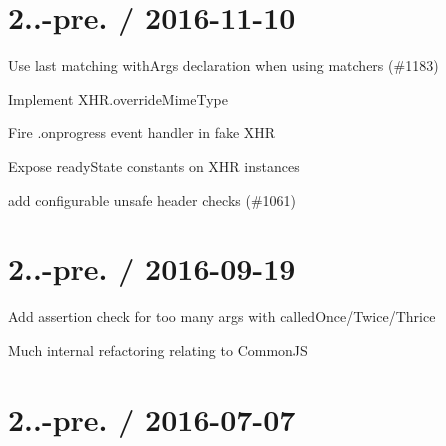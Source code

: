 \section*{2..-\/pre. / 2016-\/11-\/10 }


\begin{DoxyItemize}
\item Use last matching with\+Args declaration when using matchers (\#1183)
\item Implement X\+H\+R.\+override\+Mime\+Type
\item Fire .onprogress event handler in fake X\+HR
\item Expose ready\+State constants on X\+HR instances
\item add configurable unsafe header checks (\#1061)
\end{DoxyItemize}

\section*{2..-\/pre. / 2016-\/09-\/19 }


\begin{DoxyItemize}
\item Add assertion check for too many args with called\+Once/\+Twice/\+Thrice
\item Much internal refactoring relating to Common\+JS
\end{DoxyItemize}

\section*{2..-\/pre. / 2016-\/07-\/07 }


